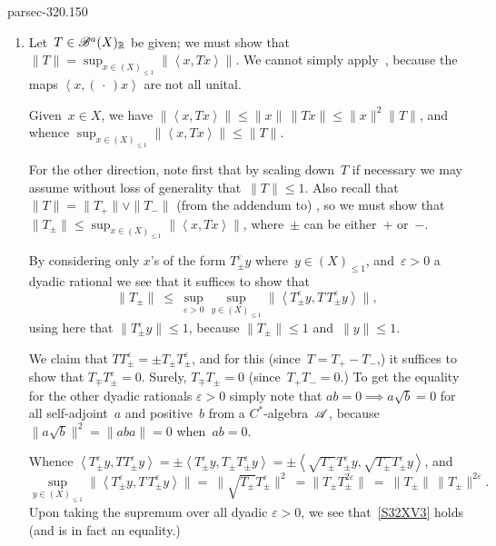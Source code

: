 \documentclass[b5page]{book}
\begin{document}
\begin{solution}{parsec-320.150}
\begin{enumerate}
For the converse,
suppose that~$\left<x,Tx\right>\geq 0$
for all~$x\in (X)_{\leq 1}$;
we must show that~$T\geq 0$.
Certainly, $T$ is self-adjoint,
because the $\left<x,Tx\right>\geq 0$ are self-adjoint.
Writing $T=T_+-T_-$
for positive $T_+$ and~$T_-$
with $T_+T_-=0$
(see~),
we need only show that~$T_-=0$.
Note that
 $TT_- = -T_-^2$,
and so
$0\leq\left<T_-x,T(T_-x)\right>
=-\left<x,T_-^3x\right>\leq 0$
for all~$x\in X$
using here that~$-T_-^3\leq 0$.
Whence $\left<x,T_-^3 x\right>=0$
for all~$x\in (X)_{\leq 1}$, 
so~$T_-^3=0$ (since the vector substates are separating,)
and thus~$T_-=0$.
\item
Let~$T\in\mathscr{B}^a(X)_{\mathbb{R}}$ be given;
we must show that $\|T\|=\sup_{x\in (X)_{\leq 1}} \|\left<x,Tx\right>\|$.
We cannot simply  apply~,
because the  maps  $\left<x,(\,\cdot\,)x\right>$
are not all unital.

Given~$x\in X$,
we have
$\|\left<x,Tx\right>\|\leq \|x\|\,\|Tx\|
\leq \|x\|^2\|T\| $,
and
whence $\sup_{x\in (X)_{\leq 1} } \|\left<x,Tx\right>\| \leq \|T\|$.

For the other direction,
note first that by scaling down~$T$ if necessary
we may assume without loss of generality that~$\|T\|\leq 1$.
Also 
recall that~$\|T\|=\|T_+\|\vee \|T_-\|$
(from the addendum to)
,
so we must show that
$\|T_\pm\| \leq 
\sup_{x\in (X)_{\leq 1} } \|\left<x,Tx\right>\|$,
where~$\pm$ can be either~$+$ or~$-$.

By considering only $x$'s of the form
$T^\varepsilon_\pm y$ where~$y\in (X)_{\leq 1}$,
and~$\varepsilon>0$ a dyadic rational
we see that it suffices to show that
\begin{equation}
\label{S32XV3}
\textstyle \|T_\pm\| 
\ \leq\  \sup_{\varepsilon>0} \sup_{y\in (X)_{\leq 1}}
\|\left<T_\pm^\varepsilon y,T\,T_\pm^\varepsilon y\right>\|,
\end{equation}
using here that $\|T_\pm^\varepsilon y \|\leq 1$,
because $\|T_\pm\|\leq 1$ and~$\|y\|\leq 1$.

We claim that $T T_{\pm}^\varepsilon = \pm T_\pm T_{\pm}^\varepsilon$,
and for this
(since~$T=T_+-T_-$,)
it suffices to show that $T_\mp T_{\pm}^\varepsilon = 0$.
Surely, $T_\mp T_\pm = 0$ (since~$T_+T_-=0$.)
To get the equality for the other dyadic rationals $\varepsilon>0$
simply note that  $ab=0 \implies a\sqrt{b} = 0$
for all self-adjoint~$a$ and positive~$b$
from a $C^*$-algebra~$\mathscr{A}$,
because $\|a\sqrt{b}\|^2=\|aba\|=0$ when~$ab=0$.

Whence $
\left<T_\pm^\varepsilon y,
T T_\pm^\varepsilon y \right>
= \pm 
\left<T_\pm^\varepsilon y,
T_\pm T_\pm^\varepsilon y \right>
=
\pm
\left<\sqrt{T_\pm} T_\pm^\varepsilon y,
\sqrt{T_\pm} T_\pm^\varepsilon y \right>$,
and
$$
\sup_{y\in (X)_{\leq 1}}
\|\left<T_\pm^\varepsilon y,T\,T_\pm^\varepsilon y\right>\|
=\ 
\|\sqrt{T_\pm} T_\pm^\varepsilon\|^2
\ = \| T_\pm T_\pm^{2\varepsilon}\|
\ = \ \|T_\pm\|\, \|T_\pm\|^{2\varepsilon}.
$$
Upon taking the supremum over all dyadic $\varepsilon >0$,
we see that~\eqref{S32XV3}
holds (and is in fact an equality.)
\end{enumerate}
\end{solution}
\end{document}
